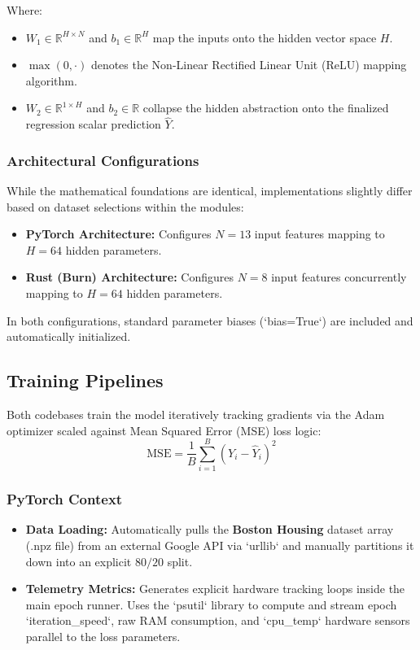 \documentclass{ieeeaccess}
\begin{document}
Where:
\begin{itemize}
    \item $W_1 \in \mathbb{R}^{H \times N}$ and $b_1 \in \mathbb{R}^H$ map the inputs onto the hidden vector space $H$.
    \item $\max(0, \cdot)$ denotes the Non-Linear Rectified Linear Unit (ReLU) mapping algorithm.
    \item $W_2 \in \mathbb{R}^{1 \times H}$ and $b_2 \in \mathbb{R}$ collapse the hidden abstraction onto the finalized regression scalar prediction $\hat{Y}$.
\end{itemize}

\subsubsection{Architectural Configurations}
While the mathematical foundations are identical, implementations slightly differ based on dataset selections within the modules:
\begin{itemize}
    \item \textbf{PyTorch Architecture:} Configures $N=13$ input features mapping to $H=64$ hidden parameters.
    \item \textbf{Rust (Burn) Architecture:} Configures $N=8$ input features concurrently mapping to $H=64$ hidden parameters.
\end{itemize}
In both configurations, standard parameter biases (`bias=True`) are included and automatically initialized.

\subsection{Training Pipelines}

Both codebases train the model iteratively tracking gradients via the Adam optimizer scaled against Mean Squared Error (MSE) loss logic:
\[ \text{MSE} = \frac{1}{B} \sum_{i=1}^{B} (Y_i - \hat{Y}_i)^2 \]

\subsubsection{PyTorch Context}
\begin{itemize}
    \item \textbf{Data Loading:} Automatically pulls the \textbf{Boston Housing} dataset array (.npz file) from an external Google API via `urllib` and manually partitions it down into an explicit $80/20$ split.
    \item \textbf{Telemetry Metrics:} Generates explicit hardware tracking loops inside the main epoch runner. Uses the `psutil` library to compute and stream epoch `iteration\_speed`, raw RAM consumption, and `cpu\_temp` hardware sensors parallel to the loss parameters.
\end{itemize}
\end{document}
